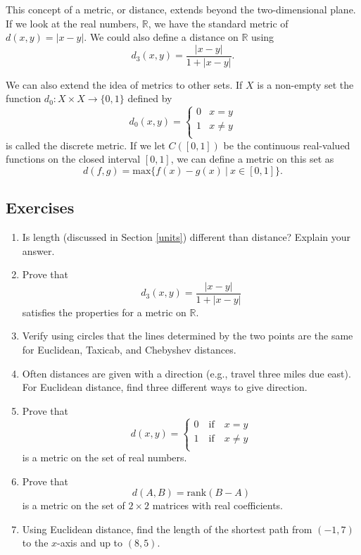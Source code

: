 \documentclass[
]{book}
\theoremstyle{definition}
\theoremstyle{definition}
\theoremstyle{definition}
\theoremstyle{definition}
\theoremstyle{remark}
\begin{document}
This concept of a metric, or distance, extends beyond the two-dimensional plane. If we look at the real numbers, \(\mathbb{R}\), we have the standard metric of \(d(x,y)=|x-y|\). We could also define a distance on \(\mathbb{R}\) using
\[d_3(x,y) = \frac{|x-y|}{1+|x-y|}.\]

We can also extend the idea of metrics to other sets. If \(X\) is a non-empty set the function \(d_0:X\times X \rightarrow \{0,1\}\) defined by \[d_0(x,y)=\begin{cases}
0 & x=y \\
1 & x\neq y \\
\end{cases}\] is called the discrete metric. If we let \(C([0,1])\) be the continuous real-valued functions on the closed interval \([0,1]\), we can define a metric on this set as \[d(f,g) = \mbox{max} \{ f(x)-g(x) \: \vert \: x\in [0,1]\}.\]

\hypertarget{exercises-46}{%
\subsection{Exercises}\label{exercises-46}}

\begin{enumerate}
\def\labelenumi{\arabic{enumi}.}
\item
  Is length (discussed in Section \ref{units}) different than distance? Explain your answer.
\item
  Prove that \[d_3(x,y) = \frac{|x-y|}{1+|x-y|}\] satisfies the properties for a metric on \(\mathbb{R}\).
\item
  Verify using circles that the lines determined by the two points are the same for Euclidean, Taxicab, and Chebyshev distances.
\item
  Often distances are given with a direction (e.g., travel three miles due east). For Euclidean distance, find three different ways to give direction.
\item
  Prove that \[d(x,y)= \left\{ \begin{array}{l}
  0 \quad \mbox{if} \quad x=y \\
  1 \quad \mbox{if} \quad x\neq y\\
  \end{array} \right.\]
  is a metric on the set of real numbers.
\item
  Prove that \[d(A,B)=\mbox{rank} (B-A)\] is a metric on the set of \(2\times 2\) matrices with real coefficients.
\item
  Using Euclidean distance, find the length of the shortest path from \((-1,7)\) to the \(x\)-axis and up to \((8,5)\).
\end{enumerate}
\end{document}
